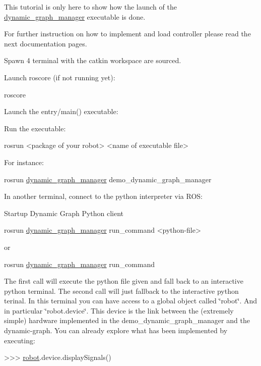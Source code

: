 This tutorial is only here to show how the launch of the \hyperlink{namespacedynamic__graph__manager}{dynamic\+\_\+graph\+\_\+manager} executable is done.

For further instruction on how to implement and load controller please read the next documentation pages.

Spawn 4 terminal with the catkin workspace are sourced.
\begin{DoxyEnumerate}
\item Launch roscore (if not running yet)\+: 
\begin{DoxyCode}
roscore
\end{DoxyCode}

\item Launch the entry/main() executable\+:
\begin{DoxyEnumerate}
\item Run the executable\+: 
\begin{DoxyCode}
rosrun <package of your robot> <name of executable file>
\end{DoxyCode}
 For instance\+: 
\begin{DoxyCode}
rosrun \hyperlink{namespacedynamic__graph__manager}{dynamic\_graph\_manager} demo\_dynamic\_graph\_manager
\end{DoxyCode}

\end{DoxyEnumerate}
\item In another terminal, connect to the python interpreter via R\+OS\+:
\begin{DoxyEnumerate}
\item Startup Dynamic Graph Python client 
\begin{DoxyCode}
rosrun \hyperlink{namespacedynamic__graph__manager}{dynamic\_graph\_manager} run\_command <python-file>
\end{DoxyCode}
 or 
\begin{DoxyCode}
rosrun \hyperlink{namespacedynamic__graph__manager}{dynamic\_graph\_manager} run\_command
\end{DoxyCode}
 The first call will execute the python file given and fall back to an interactive python terminal. The second call will just fallback to the interactive python terinal. In this terminal you can have access to a global object called \char`\"{}robot\char`\"{}. And in particular \char`\"{}robot.\+device\char`\"{}. This device is the link between the (extremely simple) hardware implemented in the demo\+\_\+dynamic\+\_\+graph\+\_\+manager and the dynamic-\/graph. You can already explore what has been implemented by executing\+: 
\begin{DoxyCode}
>>> \hyperlink{namespacerobot}{robot}.device.displaySignals()
\end{DoxyCode}


\end{DoxyEnumerate}
\end{DoxyEnumerate}
